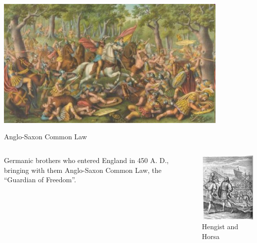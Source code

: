 \documentclass{beamer}
\begin{document}
\begin{frame}
    \centering
    \includegraphics[width=0.85\textwidth]{img/teutoburg.png} \\
\end{frame}

\begin{frame}{Anglo-Saxon Common Law}
    \begin{columns}[onlytextwidth]
            Germanic brothers who entered England in 450 A. D., bringing with them Anglo-Saxon Common Law, the ``Guardian of Freedom''.

            \centering
            \includegraphics[height=0.55\textheight]{img/hengist-horsa.png} \\
            Hengist and Horsa \\
    \end{columns}
\end{frame}
\end{document}
